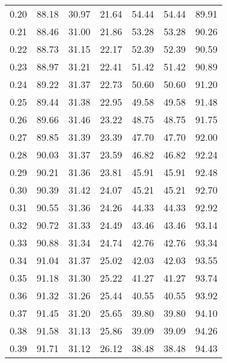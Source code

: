 \begin{tabular}{|c|c|c|c|c|c|c|}
      0.20 &     88.18 &     30.97 &      21.64 &   54.44 &      54.44 &         89.91 \\
      0.21 &     88.46 &     31.00 &      21.86 &   53.28 &      53.28 &         90.26 \\
      0.22 &     88.73 &     31.15 &      22.17 &   52.39 &      52.39 &         90.59 \\
      0.23 &     88.97 &     31.21 &      22.41 &   51.42 &      51.42 &         90.89 \\
      0.24 &     89.22 &     31.37 &      22.73 &   50.60 &      50.60 &         91.20 \\
      0.25 &     89.44 &     31.38 &      22.95 &   49.58 &      49.58 &         91.48 \\
      0.26 &     89.66 &     31.46 &      23.22 &   48.75 &      48.75 &         91.75 \\
      0.27 &     89.85 &     31.39 &      23.39 &   47.70 &      47.70 &         92.00 \\
      0.28 &     90.03 &     31.37 &      23.59 &   46.82 &      46.82 &         92.24 \\
      0.29 &     90.21 &     31.36 &      23.81 &   45.91 &      45.91 &         92.48 \\
      0.30 &     90.39 &     31.42 &      24.07 &   45.21 &      45.21 &         92.70 \\
      0.31 &     90.55 &     31.36 &      24.26 &   44.33 &      44.33 &         92.92 \\
      0.32 &     90.72 &     31.33 &      24.49 &   43.46 &      43.46 &         93.14 \\
      0.33 &     90.88 &     31.34 &      24.74 &   42.76 &      42.76 &         93.34 \\
      0.34 &     91.04 &     31.37 &      25.02 &   42.03 &      42.03 &         93.55 \\
      0.35 &     91.18 &     31.30 &      25.22 &   41.27 &      41.27 &         93.74 \\
      0.36 &     91.32 &     31.26 &      25.44 &   40.55 &      40.55 &         93.92 \\
      0.37 &     91.45 &     31.20 &      25.65 &   39.80 &      39.80 &         94.10 \\
      0.38 &     91.58 &     31.13 &      25.86 &   39.09 &      39.09 &         94.26 \\
      0.39 &     91.71 &     31.12 &      26.12 &   38.48 &      38.48 &         94.43 \\

\end{tabular}
